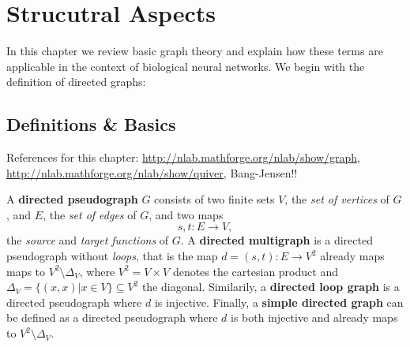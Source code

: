 \chapter{Strucutral Aspects}\label{ch:Graph Theory} %
In this chapter we review basic graph theory and explain how these terms are applicable in the context of biological neural networks. We begin with the definition of directed graphs:

\section{Definitions \& Basics}

References for this chapter: \url{http://nlab.mathforge.org/nlab/show/graph}, 
\url{http://nlab.mathforge.org/nlab/show/quiver}, Bang-Jensen!!

\begin{defn}
A \textbf{directed pseudograph} $G$ consists of two finite  sets $V$, the \textit{set of vertices} of $G$, and $E$, the \textit{set of edges} of $G$, and two maps 
\[
s,t: E \to V,
\]
the \textit{source} and \textit{target functions} of $G$. A \textbf{directed multigraph} is a directed pseudograph without \textit{loops}, that is the map $d = (s,t):E \to V^2$ already maps maps to $V^2\setminus\Delta_V$, where $V^2 = V \times V$ denotes the cartesian product and $\Delta_V = \{(x,x)|x \in V\} \subseteq V^2$ the diagonal. Similarily, a \textbf{directed loop graph} is a directed pseudograph where $d$ is injective. Finally, a \textbf{simple directed graph} can be defined as a directed pseudograph where $d$ is both injective and already maps to $V^2\setminus\Delta_V$. 
\end{defn}

